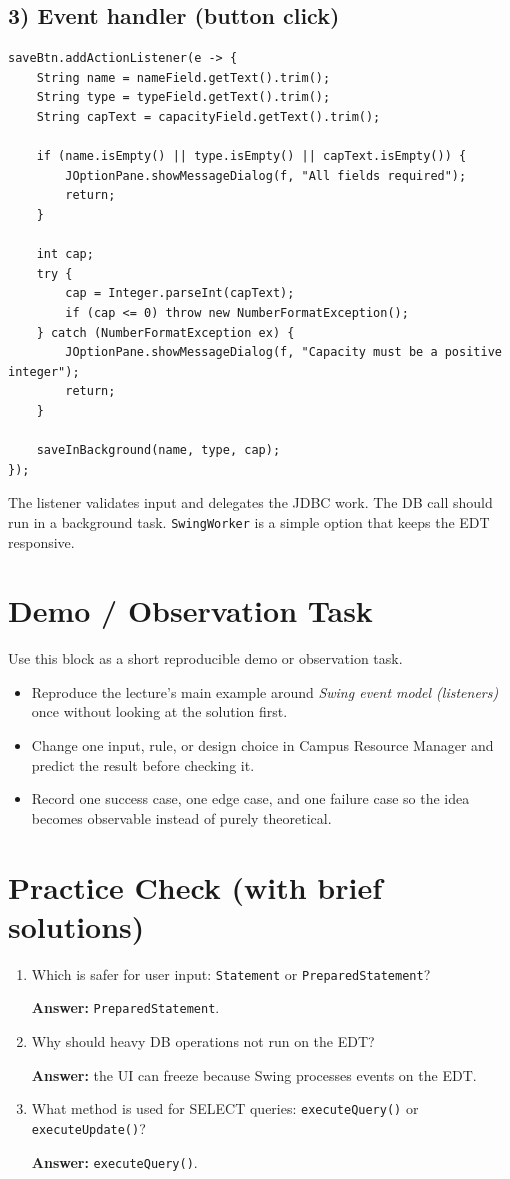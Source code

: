 \documentclass[11pt]{article}
\begin{document}
\subsection*{3) Event handler (button click)}
\begin{lstlisting}
saveBtn.addActionListener(e -> {
    String name = nameField.getText().trim();
    String type = typeField.getText().trim();
    String capText = capacityField.getText().trim();

    if (name.isEmpty() || type.isEmpty() || capText.isEmpty()) {
        JOptionPane.showMessageDialog(f, "All fields required");
        return;
    }

    int cap;
    try {
        cap = Integer.parseInt(capText);
        if (cap <= 0) throw new NumberFormatException();
    } catch (NumberFormatException ex) {
        JOptionPane.showMessageDialog(f, "Capacity must be a positive integer");
        return;
    }

    saveInBackground(name, type, cap);
});
\end{lstlisting}
The listener validates input and delegates the JDBC work. The DB call should run in a background task. \texttt{SwingWorker} is a simple option that keeps the EDT responsive.

\section{Demo / Observation Task}
Use this block as a short reproducible demo or observation task.
\begin{itemize}
  \item Reproduce the lecture's main example around \textit{Swing event model (listeners)} once without looking at the solution first.
  \item Change one input, rule, or design choice in Campus Resource Manager and predict the result before checking it.
  \item Record one success case, one edge case, and one failure case so the idea becomes observable instead of purely theoretical.
\end{itemize}
\notesources{\OOPSUnitIVSources}

\section{Practice Check (with brief solutions)}
\begin{enumerate}
  \item Which is safer for user input: \texttt{Statement} or \texttt{PreparedStatement}?\par
  \textbf{Answer:} \texttt{PreparedStatement}.

  \item Why should heavy DB operations not run on the EDT?\par
  \textbf{Answer:} the UI can freeze because Swing processes events on the EDT.

  \item What method is used for SELECT queries: \texttt{executeQuery()} or \texttt{executeUpdate()}?\par
  \textbf{Answer:} \texttt{executeQuery()}.
\end{enumerate}
\end{document}
